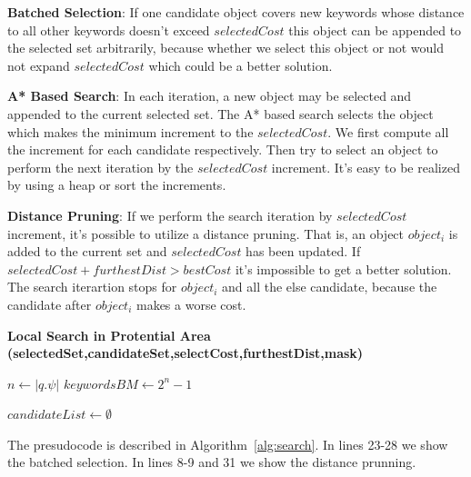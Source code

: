 \documentclass{sig-alternate}
\begin{document}
\textbf{Batched Selection}: If one candidate object covers new keywords whose distance to all other keywords doesn't exceed
$selectedCost$ this object can be appended to the selected set arbitrarily, because whether we select
this object or not would not expand $selectedCost$ which could be a better solution.

\textbf{A* Based Search}: In each iteration, a new object may be selected and
appended to the current selected set. The A* based search selects the object which
makes the minimum increment to the $selectedCost$. We first compute all the increment
for each candidate respectively. Then try to select an object to perform the next
iteration by the $selectedCost$ increment. It's easy to be realized by using a heap or
sort the increments.

\textbf{Distance Pruning}: If we perform the search iteration by $selectedCost$ increment,
it's possible to utilize a distance pruning. That is, an object $object_i$ is added
to the current set and $selectedCost$ has been updated. If
$selectedCost+furthestDist>bestCost$ it's impossible to get a better solution. The
search iterartion stops for $object_i$ and all the else candidate, because the candidate
after $object_i$ makes a worse cost.

\begin{algorithm}[!ht]\small\label{alg:search}
\caption{ \bf {Local Search in Protential Area} (selectedSet,candidateSet,selectCost,furthestDist,mask)}

$n\gets |q.\psi|$\;
$keywordsBM \gets 2^n-1$\;

$candidateList\gets \emptyset$\;

\end{algorithm}

The presudocode is described in Algorithm~\ref{alg:search}.
In lines 23-28 we show the batched selection. In lines 8-9 and 31 we 
show the distance prunning.
\end{document}
